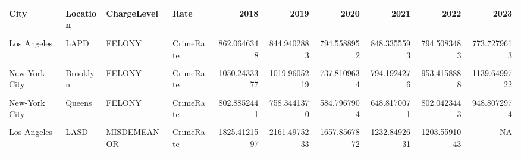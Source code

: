 \documentclass{article}
\begin{document}
\small
\begin{table}[!h]
\centering
\begin{tabular}{llllrrrrrr}
\toprule
City & Location & ChargeLevel & Rate & 2018 & 2019 & 2020 & 2021 & 2022 & 2023\\
\midrule
\midrule
\cellcolor{gray!6}{Los Angeles} & \cellcolor{gray!6}{LASD} & \cellcolor{gray!6}{FELONY} & \cellcolor{gray!6}{CrimeRate} & \cellcolor{gray!6}{672.0350524} & \cellcolor{gray!6}{724.6538777} & \cellcolor{gray!6}{684.1645301} & \cellcolor{gray!6}{647.4715872} & \cellcolor{gray!6}{679.3268737} & \cellcolor{gray!6}{NA}\\
Los Angeles & LAPD & FELONY & CrimeRate & 862.0646348 & 844.9402883 & 794.5588952 & 848.3355593 & 794.5083483 & 773.7279613\\
\cellcolor{gray!6}{New-York City} & \cellcolor{gray!6}{Bronx} & \cellcolor{gray!6}{FELONY} & \cellcolor{gray!6}{CrimeRate} & \cellcolor{gray!6}{1205.8246028} & \cellcolor{gray!6}{1239.5228623} & \cellcolor{gray!6}{942.6130496} & \cellcolor{gray!6}{1046.7781395} & \cellcolor{gray!6}{1323.9176499} & \cellcolor{gray!6}{1607.4740725}\\
New-York City & Brooklyn & FELONY & CrimeRate & 1050.2433377 & 1019.9605219 & 737.8109634 & 794.1924276 & 953.4158888 & 1139.6499722\\
\cellcolor{gray!6}{New-York City} & \cellcolor{gray!6}{Manhattan} & \cellcolor{gray!6}{FELONY} & \cellcolor{gray!6}{CrimeRate} & \cellcolor{gray!6}{1247.9884276} & \cellcolor{gray!6}{1169.8857866} & \cellcolor{gray!6}{870.7799517} & \cellcolor{gray!6}{1065.9957986} & \cellcolor{gray!6}{1282.1855541} & \cellcolor{gray!6}{1376.8184439}\\
\addlinespace
New-York City & Queens & FELONY & CrimeRate & 802.8852441 & 758.3441370 & 584.7967904 & 648.8170071 & 802.0423443 & 948.8072974\\
\cellcolor{gray!6}{New-York City} & \cellcolor{gray!6}{Staten Island} & \cellcolor{gray!6}{FELONY} & \cellcolor{gray!6}{CrimeRate} & \cellcolor{gray!6}{740.2678405} & \cellcolor{gray!6}{745.3643128} & \cellcolor{gray!6}{580.8757819} & \cellcolor{gray!6}{624.0540415} & \cellcolor{gray!6}{677.9171195} & \cellcolor{gray!6}{868.9857282}\\
Los Angeles & LASD & MISDEMEANOR & CrimeRate & 1825.4121597 & 2161.4975233 & 1657.8567872 & 1232.8492631 & 1203.5591043 & NA\\
\cellcolor{gray!6}{Los Angeles} & \cellcolor{gray!6}{LAPD} & \cellcolor{gray!6}{MISDEMEANOR} & \cellcolor{gray!6}{CrimeRate} & \cellcolor{gray!6}{1398.8455568} & \cellcolor{gray!6}{1235.8880560} & \cellcolor{gray!6}{779.3233091} & \cellcolor{gray!6}{743.6191794} & \cellcolor{gray!6}{684.2064780} & \cellcolor{gray!6}{761.4440492}\\

\end{tabular}
\end{table}
\end{document}
